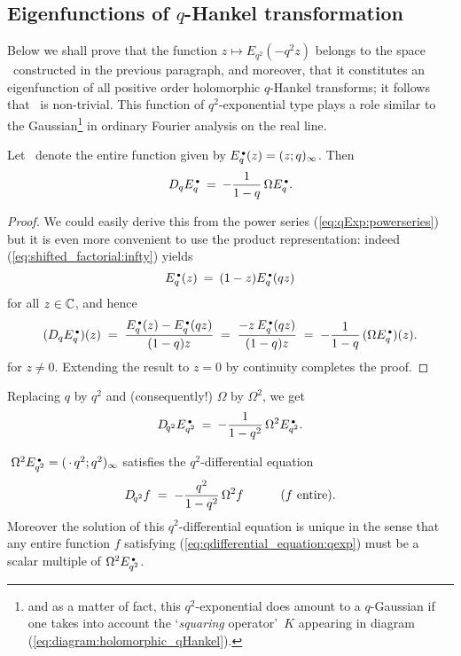
\subsection{Eigenfunctions of $q$-Hankel transformation}


Below we shall prove that the function $z \mapsto E_{q^2}(-q^2 z)$
belongs to the space \Hcore\ constructed in the previous paragraph,
and moreover, that it constitutes an eigenfunction of all positive order
holomorphic $q$-Hankel transforms; it follows that \Hcore\ is non-trivial.
This function of $q^2$-exponential type plays a role similar to the
Gaussian\footnote{and as a matter of fact, this $q^2$-exponential does amount
to a $q$-Gaussian if one takes into account the \lq{\em squaring\/} operator\rq\ $K$
appearing in diagram (\ref{eq:diagram:holomorphic_qHankel}).}
in ordinary Fourier analysis on the real line.


\begin{lemma}
Let\/ \qE\ denote the entire function given by\/ $E_q^{\scriptscriptstyle \,\bullet}(z) = (z;q)_\infty$. Then
$$   D_q E_q^{\scriptscriptstyle \,\bullet} \:=\: -\frac{1}{1-q}\, \Omega E_q^{\scriptscriptstyle \,\bullet}. $$
\end{lemma}

\begin{proof}
We could easily derive this from the power series (\ref{eq:qExp:powerseries})
but it is even more convenient to use the product representation:
indeed (\ref{eq:shifted_factorial:infty}) yields
$$E_q^{\scriptscriptstyle \,\bullet}(z) \:=\: (1-z)E_q^{\scriptscriptstyle \,\bullet}(qz) $$
for all $z\in \mathbb{C}$, and hence
$$ (D_q E_q^{\scriptscriptstyle \,\bullet})(z) \;=\;  \frac{E_q^{\scriptscriptstyle \,\bullet}(z) - E_q^{\scriptscriptstyle \,\bullet}(qz)}{(1-q)z}
                \;=\; \frac{-z\,E_q^{\scriptscriptstyle \,\bullet}(qz)}{(1-q)z}
                \;=\; -\frac{1}{1-q} \, (\Omega E_q^{\scriptscriptstyle \,\bullet})(z). $$
for $z\neq 0$. Extending the result to $z=0$ by continuity completes the proof.
\end{proof}



\begin{cor} \label{cor:qqderivative:qqE}
Replacing\/ $q$ by\/ $q^2$ and (consequently!)\/ $\Omega$ by\/ $\Omega^2$, we get
$$  D_{\!q^2} E_{q^2}^{\scriptscriptstyle \, \bullet} \:=\: -\frac{1}{1-q^2}\, \Omega^2 E_{q^2}^{\scriptscriptstyle \, \bullet}. $$
\end{cor}



\begin{prop} \label{prop:qdifferential_equation:qexp}
$\;\Omega^2 E_{q^2}^{\scriptscriptstyle \, \bullet} = (\,\cdot\,q^2 ;q^2)_\infty$ satisfies the\/
$q^2$-differential equation
\begin{equation}\label{eq:qdifferential_equation:qexp}
   D_{\!q^2} f \;=\; -\frac{q^2}{1-q^2}\, \Omega^2 f
     \hspace{3em} \mbox{($f$ entire).}
\end{equation}
Moreover the solution of this\/ $q^2$-differential equation is
unique in the sense that any entire function\/ $f$
satisfying (\ref{eq:qdifferential_equation:qexp}) must be a scalar
multiple of\/ $\Omega^2 E_{q^2}^{\scriptscriptstyle \, \bullet}$.
\end{prop}


